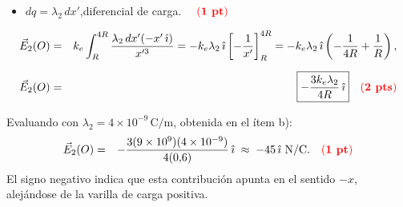 \documentclass{article}
\newcommand{\ke}{k_e}
\begin{document}
\begin{enumerate}[label={\alph*)}]
\begin{itemize}[leftmargin=2em, itemsep=4pt]
        \begin{eqnarray*}
          \vec r-\vec r\,' &=& -x'\,\hat\imath, \quad{\color{red}(\textbf{1 pt})}\\[4pt]
          \|\vec r-\vec r\,'\| &=& x'.
        \end{eqnarray*}

  \item $dq=\lambda_2\,dx'$,\quad diferencial de carga.
        $\quad{\color{red}(\textbf{1 pt})}$
\end{itemize}

\begin{eqnarray*}
  \vec E_2(O) &=& \ke\int_R^{4R}\frac{\lambda_2\,dx'(-x'\,\hat\imath)}{x'^3}
      = -\ke\lambda_2\,\hat\imath\left[-\frac1{x'}\right]_R^{4R}
      = -\ke\lambda_2\,\hat\imath\left(-\frac1{4R}+\frac1R\right),\\[6pt]
  \vec E_2(O) &=& \boxed{-\frac{3\ke\lambda_2}{4R}\,\hat\imath}
  \quad{\color{red}(\textbf{2 pts})}
\end{eqnarray*}

Evaluando con $\lambda_2=4\times10^{-9}\,\text{C/m}$, obtenida en el ítem b):
\begin{eqnarray*}
  \vec E_2(O) &=& -\frac{3(9\times10^9)(4\times10^{-9})}{4(0{,}6)}\,\hat\imath
  \;\approx\; -45\,\hat\imath\ \text{N/C}. \quad{\color{red}(\textbf{1 pt})}
\end{eqnarray*}
El signo negativo indica que esta contribución apunta en el sentido $-x$, alejándose de la varilla de carga positiva.

\end{enumerate}
\end{document}
